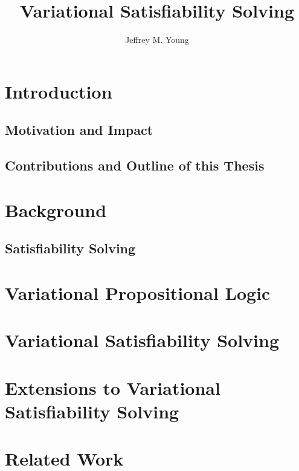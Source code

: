 \documentclass[onehalf,11pt]{beavtex}
\title{Variational Satisfiability Solving}
\author{Jeffrey M. Young}
\begin{document}
\maketitle

\mainmatter

\chapter{Introduction}
\section{Motivation and Impact}
\section{Contributions and Outline of this Thesis}

\chapter{Background}

\section{Satisfiability Solving}

\chapter{Variational Propositional Logic}

\chapter{Variational Satisfiability Solving}

\chapter{Extensions to Variational Satisfiability Solving}


\chapter{Related Work}
\end{document}
